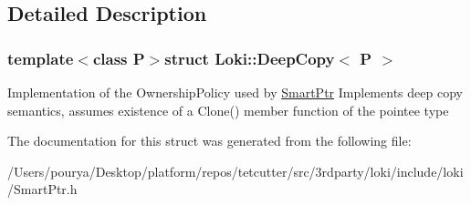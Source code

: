 \subsection{Detailed Description}
\subsubsection*{template$<$class P$>$struct Loki\+::\+Deep\+Copy$<$ P $>$}

Implementation of the Ownership\+Policy used by \hyperlink{classLoki_1_1SmartPtr}{Smart\+Ptr} Implements deep copy semantics, assumes existence of a Clone() member function of the pointee type 

The documentation for this struct was generated from the following file\+:\begin{DoxyCompactItemize}
\item 
/\+Users/pourya/\+Desktop/platform/repos/tetcutter/src/3rdparty/loki/include/loki/Smart\+Ptr.\+h\end{DoxyCompactItemize}
